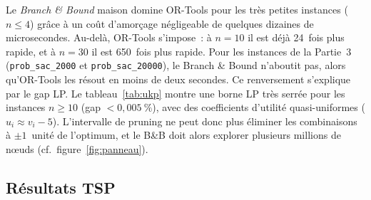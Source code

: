 \documentclass[11pt,a4paper]{article}
\begin{document}
Le \emph{Branch \& Bound} maison domine OR-Tools pour les très petites instances ($n \leq 4$) grâce à un coût d'amorçage négligeable de quelques dizaines de microsecondes. Au-delà, OR-Tools s'impose~: à $n = 10$ il est déjà 24~fois plus rapide, et à $n = 30$ il est 650~fois plus rapide. Pour les instances de la Partie~3 (\texttt{prob\_sac\_2000} et \texttt{prob\_sac\_20000}), le Branch \& Bound n'aboutit pas, alors qu'OR-Tools les résout en moins de deux secondes. Ce renversement s'explique par le gap LP. Le tableau~\ref{tab:ukp} montre une borne LP très serrée pour les instances $n \geq 10$ (gap $< 0{,}005~\%$), avec des coefficients d'utilité quasi-uniformes ($u_i \approx v_i - 5$). L'intervalle de pruning ne peut donc plus éliminer les combinaisons à $\pm 1$~unité de l'optimum, et le B\&B doit alors explorer plusieurs millions de nœuds (cf.\ figure~\ref{fig:panneau}).

\subsection{Résultats TSP}
\end{document}

